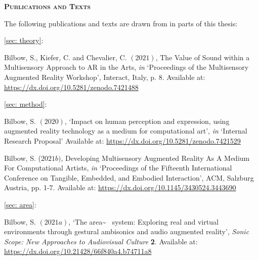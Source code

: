 \newpage
{}
{}
\begin{flushleft}
	\Huge \textsc{\textbf{Publications and Texts}}

\end{flushleft}
\noindent The following publications and texts are drawn from in parts of this thesis:

\noindent\autoref{sec: theory}:  \\ \citep{bilbow2021}

\begin{hangparas}{.25in}{1}
	Bilbow, S., Kiefer, C. and Chevalier, C. $(2021)$, The Value of Sound within a Multisensory Approach to AR in the Arts, \textit{in} `Proceedings of the Multisensory Augmented Reality Workshop', Interact, Italy, p. 8. Available at: \url{https://dx.doi.org/10.5281/zenodo.7421488}
\end{hangparas}

\vspace*{0.75cm}
\noindent\autoref{sec: method}:  \\ \citep{bilbow2020,bilbow2021b}

\begin{hangparas}{.25in}{1}
	Bilbow, S. $(2020)$, `Impact on human perception and expression, using augmented reality technology as a medium for computational art', \textit{in} `Internal Research Proposal' Available at: \url{https://dx.doi.org/10.5281/zenodo.7421529}
\end{hangparas}

\begin{hangparas}{.25in}{1}
	Bilbow, S. ($2021b)$, Developing Multisensory Augmented Reality As A Medium For Computational Artists, \textit{in} `Proceedings of the Fifteenth International Conference on Tangible, Embedded, and Embodied Interaction', ACM, Salzburg Austria, pp. 1-7. Available at: \url{https://dx.doi.org/10.1145/3430524.3443690}
\end{hangparas}

\vspace*{0.75cm}
\noindent\autoref{sec: area}:  \\ \citep{bilbow2021a}

\begin{hangparas}{.25in}{1}
	Bilbow, S. $(2021a)$, `The area\textasciitilde{}~ system: Exploring real and virtual environments through gestural ambisonics and audio augmented reality', \textit{Sonic Scope: New Approaches to Audiovisual Culture} \textbf{2}. Available at: \url{https://dx.doi.org/10.21428/66f840a4.b74711a8}
\end{hangparas}

